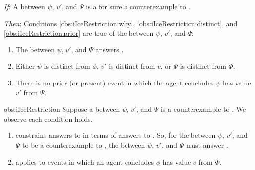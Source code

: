 \begin{note}
    \begin{observation}%
    \label{obs:iIceRestriction}%
    \vspace{-\baselineskip}
    \begin{itenum}
    \item[\emph{If}:]
      A \ros{} between \(\psi\), \(v'\), and \(\Psi\) is a for sure a counterexample to \issueInclusion{}.
    \item[\emph{Then}:]
      Conditions \ref{obs:iIceRestriction:why}, \ref{obs:iIceRestriction:distinct}, and \ref{obs:iIceRestriction:prior} are true of the \ros{} between \(\psi\), \(v'\), and \(\Psi\):
      \begin{enumerate}[label=\arabic*., ref=\arabic*]
      \item
        \label{obs:iIceRestriction:why}
        The \ros{} between \(\psi\), \(v'\), and \(\Psi\) answers \qWhy{}.
      \item
        \label{obs:iIceRestriction:distinct}
        Either \(\psi\) is distinct from \(\phi\), \(v'\) is distinct from \(v\), or \(\Psi\) is distinct from \(\Phi\).
      \item
        \label{obs:iIceRestriction:prior}
        There is no prior (or present) event in which the agent concludes \(\psi\) has value \(v'\) from \(\Psi\).
      \end{enumerate}
    \end{itenum}
    \vspace{-1.5\baselineskip}
  \end{observation}
  \begin{motivation}{obs:iIceRestriction}
    Suppose a \ros{} between \(\psi\), \(v'\), and \(\Psi\) is a counterexample to \issueInclusion{}.
    We observe each condition holds.

    \begin{enumerate}
    \item
      \issueInclusion{} constrains answers to \qWhy{} in terms of answers to \qHow{}.
    So, for the \ros{} between \(\psi\), \(v'\), and \(\Psi\) to be a counterexample to \issueInclusion{}, the \ros{} between \(\psi\), \(v'\), and \(\Psi\) must answer \qWhy{}.
  \item
    \qWhy{} applies to events in which an agent concludes \(\phi\) has value \(v\) from \(\Phi\).


\end{enumerate}
\end{motivation}
\end{note}
